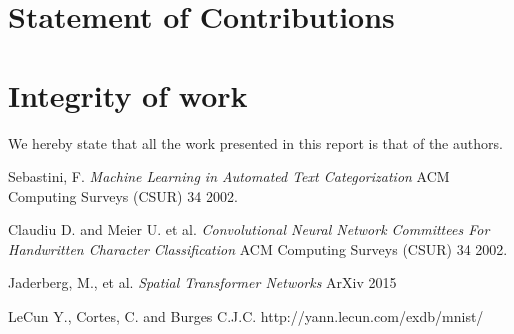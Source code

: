 \documentclass[conference]{IEEEtran}
\begin{document}
\section{Statement of Contributions}

\section{Integrity of work}
We hereby state that all the work presented in this report is that of the authors.
\begin{thebibliography}{9}

 Sebastini, F.
  \emph{Machine Learning in Automated Text Categorization}
  ACM Computing Surveys (CSUR) 34
  2002.

 Claudiu D. and Meier U. et al.
  \emph{Convolutional Neural Network Committees For Handwritten Character
Classification}
  ACM Computing Surveys (CSUR) 34
  2002.

 Jaderberg, M., et al.
  \emph{Spatial Transformer Networks}
  ArXiv
  2015

LeCun Y., Cortes, C. and Burges C.J.C.
	http://yann.lecun.com/exdb/mnist/

\end{thebibliography}
\end{document}

